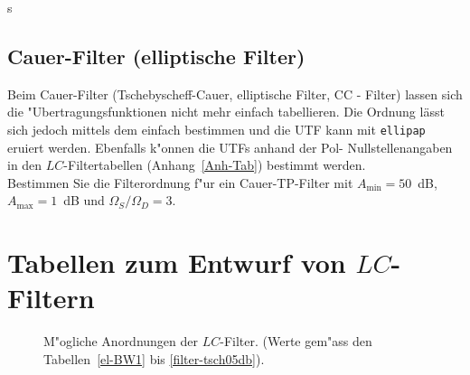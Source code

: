 s
\clearpage

\subsection{Cauer-Filter (elliptische Filter)}
Beim Cauer-Filter (Tschebyscheff-Cauer, elliptische Filter, CC -
Filter) lassen sich die "Ubertragungsfunktionen nicht mehr einfach
tabellieren. Die Ordnung l\"asst sich jedoch mittels dem  einfach bestimmen und die UTF kann mit {\tt ellipap}
eruiert werden.  Ebenfalls k"onnen die UTFs anhand der Pol-
Nullstellenangaben in den $LC$-Filtertabellen
(Anhang~\ref{Anh-Tab}) bestimmt werden.  \\
\aufg
Bestimmen Sie die Filterordnung f"ur ein Cauer-TP-Filter mit $A_{\min}=50$~dB, $A_{\max}=1$~dB und $\Omega_S/\Omega_D=3$.


\section{Tabellen zum Entwurf von {\boldmath $LC$}-Filtern \label{Anh-Tab}}
\begin{figure}[!htb]
\vspace*{-8mm}
\begin{center}
  \hspace*{-0cm}\vspace*{-1mm}\caption{M"ogliche Anordnungen der $LC$-Filter. (Werte gem"ass den Tabellen~\ref{el-BW1} bis \ref{filter-tsch05db}).}
\end{center}
\vspace*{-6mm}
\end{figure}

